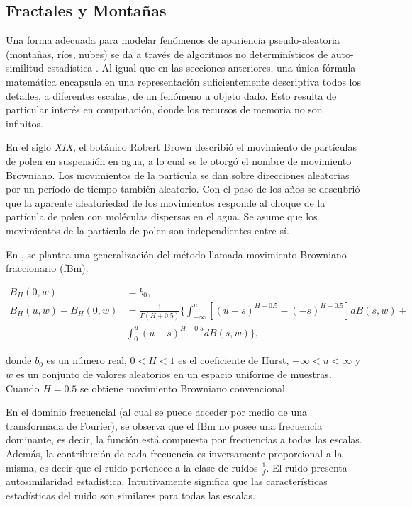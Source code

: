 \subsection{Fractales y Montañas}
Una forma adecuada para modelar fenómenos de apariencia pseudo-aleatoria (montañas, ríos, nubes) se da a través de algoritmos no determinísticos de auto-similitud estadística \cite{Mandelbrot1983}.
Al igual que en las secciones anteriores, una única fórmula matemática encapsula en una representación suficientemente descriptiva todos los detalles, a diferentes escalas, de un fenómeno u objeto dado.
Esto resulta de particular interés en computación, donde los recursos de memoria no son infinitos.

En el siglo {\it XIX}, el botánico Robert Brown describió el movimiento de partículas de polen en suspensión en agua, a lo cual se le otorgó el nombre de movimiento Browniano.
Los movimientos de la partícula se dan sobre direcciones aleatorias por un período de tiempo también aleatorio.
Con el paso de los años se descubrió que la aparente aleatoriedad de los movimientos responde al choque de la partícula de polen con moléculas dispersas en el agua.
Se asume que los movimientos de la partícula de polen son independientes entre sí.

En \cite{Mandelbrot1968}, se plantea una generalización del método llamada movimiento Browniano fraccionario (\acrshort{fBm}). 

\begin{align*}
B_{H}(0,w) &= b_{0},\\
B_{H}(u,w)- B_{H}(0,w) &= \frac{1}{\Gamma(H+0.5)} \big\{ \int_{-\infty}^{u} [(u-s)^{H-0.5} - (-s)^{H-0.5} ] dB(s,w) + \\
&  \int_{0}^{u} (u-s)^{H-0.5} dB(s,w) \big \},
\end{align*}


\noindent donde $b_{0}$ es un número real, $0 < H < 1$ es el coeficiente de Hurst, $-\infty < u < \infty $ y $w$ es un conjunto de valores aleatorios en un espacio uniforme de muestras.
Cuando $H = 0.5$ se obtiene movimiento Browniano convencional.

En el dominio frecuencial (al cual se puede acceder por medio de una transformada de Fourier), se observa que el fBm no posee una frecuencia dominante, es decir, la función está compuesta por frecuencias a todas las escalas.
Además, la contribución de cada frecuencia es inversamente proporcional a la misma, es decir que el ruido pertenece a la clase de ruidos $\frac{1}{f}$.
El ruido presenta autosimilaridad estadística.
Intuitivamente significa que las características estadísticas del ruido son similares para todas las escalas.

